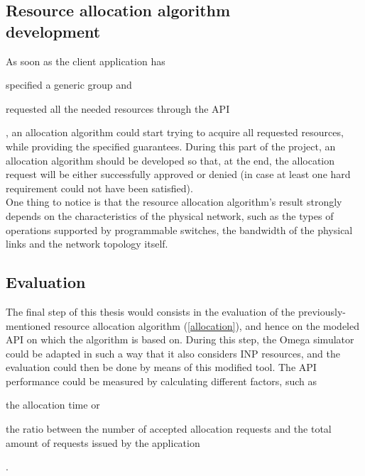 \documentclass[letterpaper,twocolumn,10pt]{article}
\begin{document}
\subsection[Resource allocation algorithm development]{Resource allocation algorithm\\development} \label{allocation}
As soon as the client application has
\begin{mylist}
    \item specified a generic group and
    \item requested all the needed resources through the API
\end{mylist}
, an allocation algorithm could start trying to acquire all requested resources, while providing the specified guarantees. During this part of the project, an allocation algorithm should be developed so that, at the end, the allocation request will be either successfully approved or denied (in case at least one hard requirement could not have been satisfied).\\
One thing to notice is that the resource allocation algorithm's result strongly depends on the characteristics of the physical network, such as the types of operations supported by programmable switches, the bandwidth of the physical links and the network topology itself.
\subsection{Evaluation}
The final step of this thesis would consists in the evaluation of the previously-mentioned resource allocation algorithm (\autoref{allocation}), and hence on the modeled API on which the algorithm is based on.
During this step, the Omega simulator \cite{omega} could be adapted in such a way that it also considers INP resources, and the evaluation could then be done by means of this modified tool.
The API performance could be measured by calculating different factors, such as 
\begin{mylist}
  \item the allocation time or
  \item the ratio between the number of accepted allocation requests and the total amount of requests issued by the application
\end{mylist}.



\end{document}
